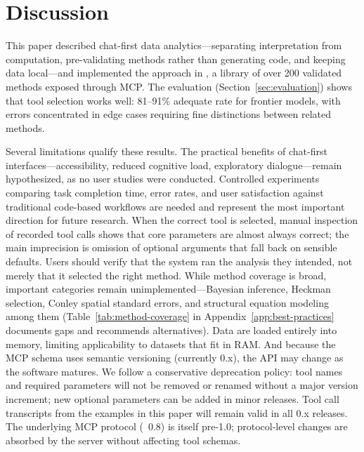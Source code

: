 
\section{Discussion} \label{sec:discussion}

This paper described chat-first data analytics---separating
interpretation from computation, pre-validating methods rather than
generating code, and keeping data local---and implemented the approach
in , a  library of over 200
validated methods exposed through MCP. The evaluation
(Section~\ref{sec:evaluation}) shows that tool selection works well:
81--91\% adequate rate for frontier models, with errors concentrated in
edge cases requiring fine distinctions between related methods.

Several limitations qualify these results. The practical benefits of
chat-first interfaces---accessibility, reduced cognitive load,
exploratory dialogue---remain hypothesized, as no user studies were
conducted. Controlled experiments comparing task completion time, error
rates, and user satisfaction against traditional code-based workflows
are needed and represent the most important direction for future
research. When the correct tool is selected, manual inspection of
recorded tool calls shows that core parameters are almost always
correct; the main imprecision is omission of optional arguments that
fall back on sensible defaults. Users should verify that the system
ran the analysis they intended, not merely that it selected the right
method. While method coverage is broad, important categories
remain unimplemented---Bayesian inference, Heckman selection, Conley
spatial standard errors, and structural equation modeling among
them (Table~\ref{tab:method-coverage} in
Appendix~\ref{app:best-practices} documents gaps and recommends
alternatives). Data are loaded entirely into memory, limiting
applicability to datasets that fit in RAM. And because the MCP schema
uses semantic versioning (currently 0.x), the API may change as the
software matures.  We follow a conservative deprecation policy: tool
names and required parameters will not be removed or renamed without
a major version increment; new optional parameters can be added in
minor releases.  Tool call transcripts from the examples in this
paper will remain valid in all 0.x releases.  The underlying MCP
protocol (~0.8) is itself pre-1.0; protocol-level changes
are absorbed by the server without affecting tool schemas.


